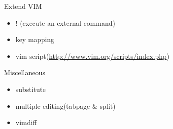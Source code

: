 \documentclass[c]{beamer}
\begin{document}
\begin{frame}{Extend VIM}
    \pause
    \begin{itemize}
        \item ! (execute an external command)
        \pause
        \item key mapping
        \pause
        \item vim script(\url{http://www.vim.org/scripts/index.php})
    \end{itemize}
\end{frame}

\begin{frame}{Miscellaneous}
    \pause
    \begin{itemize}
        \item substitute
        \pause
        \item multiple-editing(tabpage \& split)
        \pause
        \item vimdiff
    \end{itemize}
\end{frame}
\end{document}
